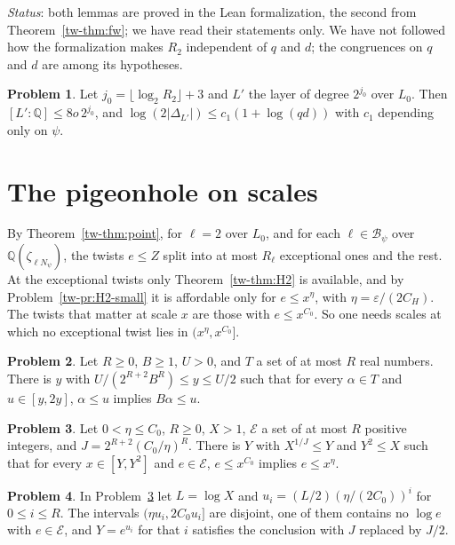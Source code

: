 \documentclass[reqno]{amsart}
\theoremstyle{definition}
\newtheorem{problem}{Problem}[section]
\theoremstyle{plain}
\theoremstyle{remark}
\newcommand{\Q}{\mathbb{Q}}
\newcommand{\Bc}{\mathcal{B}}
\newcommand{\Ec}{\mathcal{E}}
\begin{document}
\noindent\emph{Status}: both lemmas are proved in the Lean formalization, the second from Theorem~\ref{tw-thm:fw}; we have read their statements only.  We have not followed how the formalization makes \(R_2\) independent of \(q\) and \(d\); the congruences on \(q\) and \(d\) are among its hypotheses.

\begin{problem}\label{pr:L0-disc}
Let \(j_0=\lfloor\log_2R_2\rfloor+3\) and \(L'\) the layer of degree \(2^{j_0}\) over \(L_0\).  Then \([L':\Q]\le8o\,2^{j_0}\), and \(\log(2\lvert\Delta_{L'}\rvert)\le c_1(1+\log(qd))\) with \(c_1\) depending only on \(\psi\).
\end{problem}

\section{The pigeonhole on scales}\label{sec:pigeonhole}

By Theorem~\ref{tw-thm:point}, for \(\ell=2\) over \(L_0\), and for each \(\ell\in\Bc_\psi\) over \(\Q(\zeta_{\ell N_\psi})\), the twists \(e\le Z\) split into at most \(R_\ell\) exceptional ones and the rest.  At the exceptional twists only Theorem~\ref{tw-thm:H2} is available, and by Problem~\ref{tw-pr:H2-small} it is affordable only for \(e\le x^\eta\), with \(\eta=\varepsilon/(2C_H)\).  The twists that matter at scale \(x\) are those with \(e\le x^{C_0}\).  So one needs scales at which no exceptional twist lies in \((x^\eta,x^{C_0}]\).

\begin{problem}\label{pr:window1}
Let \(R\ge0\), \(B\ge1\), \(U>0\), and \(T\) a set of at most \(R\) real numbers.  There is \(y\) with \(U/(2^{R+2}B^R)\le y\le U/2\) such that for every \(\alpha\in T\) and \(u\in[y,2y]\), \(\alpha\le u\) implies \(B\alpha\le u\).
\end{problem}

\begin{problem}\label{pr:window}
Let \(0<\eta\le C_0\), \(R\ge0\), \(X>1\), \(\Ec\) a set of at most \(R\) positive integers, and \(J=2^{R+2}(C_0/\eta)^R\).  There is \(Y\) with \(X^{1/J}\le Y\) and \(Y^2\le X\) such that for every \(x\in[Y,Y^2]\) and \(e\in\Ec\), \(e\le x^{C_0}\) implies \(e\le x^\eta\).
\end{problem}

\begin{problem}\label{pr:zhang}
In Problem~\ref{pr:window} let \(L=\log X\) and \(u_i=(L/2)(\eta/(2C_0))^i\) for \(0\le i\le R\).  The intervals \((\eta u_i,2C_0u_i]\) are disjoint, one of them contains no \(\log e\) with \(e\in\Ec\), and \(Y=e^{u_i}\) for that \(i\) satisfies the conclusion with \(J\) replaced by \(J/2\).
\end{problem}
\end{document}
